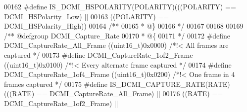\begin{DoxyCode}
00162 \textcolor{preprocessor}{#}\textcolor{preprocessor}{define} \textcolor{preprocessor}{IS\_DCMI\_HSPOLARITY}\textcolor{preprocessor}{(}\textcolor{preprocessor}{POLARITY}\textcolor{preprocessor}{)}\textcolor{preprocessor}{(}\textcolor{preprocessor}{(}\textcolor{preprocessor}{(}\textcolor{preprocessor}{POLARITY}\textcolor{preprocessor}{)} \textcolor{preprocessor}{==} DCMI_HSPolarity_Low\textcolor{preprocessor}{)} \textcolor{preprocessor}{||}
00163                                      \textcolor{preprocessor}{(}\textcolor{preprocessor}{(}\textcolor{preprocessor}{POLARITY}\textcolor{preprocessor}{)} \textcolor{preprocessor}{==} DCMI_HSPolarity_High\textcolor{preprocessor}{)}\textcolor{preprocessor}{)}
00164 \textcolor{comment}{/**}
00165 \textcolor{comment}{  * @\}}
00166 \textcolor{comment}{  */}
00167 
00168 
00169 \textcolor{comment}{/** @defgroup DCMI\_Capture\_Rate }
00170 \textcolor{comment}{  * @\{}
00171 \textcolor{comment}{  */}
00172 \textcolor{preprocessor}{#}\textcolor{preprocessor}{define} \textcolor{preprocessor}{DCMI\_CaptureRate\_All\_Frame}     \textcolor{preprocessor}{(}\textcolor{preprocessor}{(}\textcolor{preprocessor}{uint16\_t}\textcolor{preprocessor}{)}0x0000\textcolor{preprocessor}{)} \textcolor{comment}{/*!< All frames are captured */}
00173 \textcolor{preprocessor}{#}\textcolor{preprocessor}{define} \textcolor{preprocessor}{DCMI\_CaptureRate\_1of2\_Frame}    \textcolor{preprocessor}{(}\textcolor{preprocessor}{(}\textcolor{preprocessor}{uint16\_t}\textcolor{preprocessor}{)}0x0100\textcolor{preprocessor}{)} \textcolor{comment}{/*!< Every alternate frame captured */}
00174 \textcolor{preprocessor}{#}\textcolor{preprocessor}{define} \textcolor{preprocessor}{DCMI\_CaptureRate\_1of4\_Frame}    \textcolor{preprocessor}{(}\textcolor{preprocessor}{(}\textcolor{preprocessor}{uint16\_t}\textcolor{preprocessor}{)}0x0200\textcolor{preprocessor}{)} \textcolor{comment}{/*!< One frame in 4 frames captured */}
00175 \textcolor{preprocessor}{#}\textcolor{preprocessor}{define} \textcolor{preprocessor}{IS\_DCMI\_CAPTURE\_RATE}\textcolor{preprocessor}{(}\textcolor{preprocessor}{RATE}\textcolor{preprocessor}{)} \textcolor{preprocessor}{(}\textcolor{preprocessor}{(}\textcolor{preprocessor}{(}\textcolor{preprocessor}{RATE}\textcolor{preprocessor}{)} \textcolor{preprocessor}{==} DCMI_CaptureRate_All_Frame\textcolor{preprocessor}{)} \textcolor{preprocessor}{||}
00176                                     \textcolor{preprocessor}{(}\textcolor{preprocessor}{(}\textcolor{preprocessor}{RATE}\textcolor{preprocessor}{)} \textcolor{preprocessor}{==} DCMI_CaptureRate_1of2_Frame\textcolor{preprocessor}{)} \textcolor{preprocessor}{||}

\end{DoxyCode}
